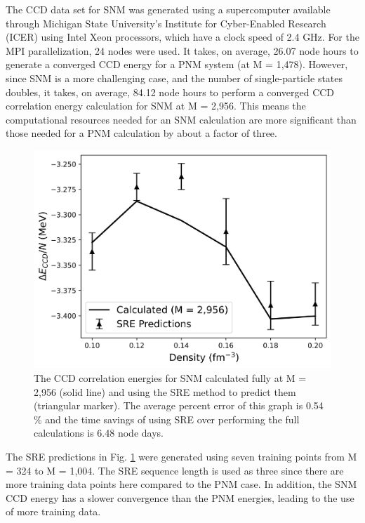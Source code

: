 The CCD data set for SNM was generated using a supercomputer available through Michigan State University's Institute for Cyber-Enabled Research (ICER) using Intel Xeon processors, which have a clock speed of 2.4 GHz. For the MPI parallelization, 24 nodes were used. It takes, on average, 26.07 node hours to generate a converged CCD energy for a PNM system (at M = 1,478). However, since SNM is a more challenging case, and the number of single-particle states doubles, it takes, on average, 84.12 node hours to perform a converged CCD correlation energy calculation for SNM at M = 2,956. This means the computational resources needed for an SNM calculation are more significant than those needed for a PNM calculation by about a factor of three.

\begin{figure}
    \centering
    \includegraphics[scale=0.75]{Images/Chapter8/FinalReport3b-3.png}
    \caption{The CCD correlation energies for SNM calculated fully at M = 2,956 (solid line) and using the SRE method to predict them (triangular marker).  The average percent error of this graph is 0.54$\%$ and the time savings of using SRE over performing the full calculations is 6.48 node days.}
    \label{fig:snm_ccd}
\end{figure}

The SRE predictions in Fig. \ref{fig:snm_ccd} were generated using seven training points from M = 324 to M = 1,004. The SRE sequence length is used as three since there are more training data points here compared to the PNM case. In addition, the SNM CCD energy has a slower convergence than the PNM energies, leading to the use of more training data.

